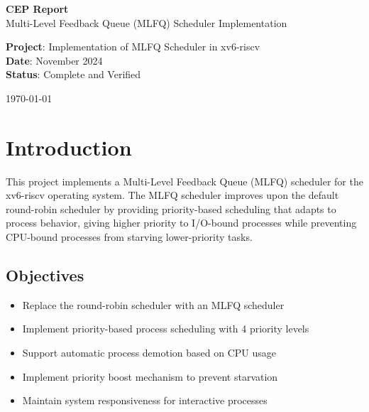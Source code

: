 \documentclass[11pt,a4paper]{article}
\begin{document}
\begin{titlepage}
    \centering
    \vspace*{2cm}
    
    {\Huge\bfseries CEP Report}\\[0.5cm]
    {\Large Multi-Level Feedback Queue (MLFQ) Scheduler Implementation}\\[1cm]
    
    \vspace{1cm}
    
    {\large\textbf{Project}: Implementation of MLFQ Scheduler in xv6-riscv}\\[0.3cm]
    {\large\textbf{Date}: November 2024}\\[0.3cm]
    {\large\textbf{Status}: \textcolor{green!70!black}{Complete and Verified}}\\[1cm]
    
    \vfill
    
    
    \vspace{1cm}
    
    \today
\end{titlepage}

\newpage
\tableofcontents
\newpage

\section{Introduction}

This project implements a Multi-Level Feedback Queue (MLFQ) scheduler for the xv6-riscv operating system. The MLFQ scheduler improves upon the default round-robin scheduler by providing priority-based scheduling that adapts to process behavior, giving higher priority to I/O-bound processes while preventing CPU-bound processes from starving lower-priority tasks.

\subsection{Objectives}

\begin{itemize}
    \item Replace the round-robin scheduler with an MLFQ scheduler
    \item Implement priority-based process scheduling with 4 priority levels
    \item Support automatic process demotion based on CPU usage
    \item Implement priority boost mechanism to prevent starvation
    \item Maintain system responsiveness for interactive processes
\end{itemize}
\end{document}
